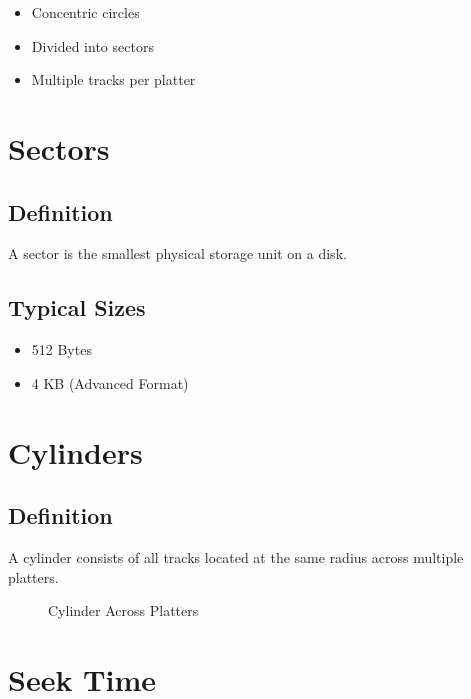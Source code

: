 \begin{itemize}
\item Concentric circles
\item Divided into sectors
\item Multiple tracks per platter
\end{itemize}

\section{Sectors}

\subsection{Definition}

A sector is the smallest physical storage unit on a disk.

\subsection{Typical Sizes}

\begin{itemize}
\item 512 Bytes
\item 4 KB (Advanced Format)
\end{itemize}

\section{Cylinders}

\subsection{Definition}

A cylinder consists of all tracks located at the same radius across multiple platters.

\begin{figure}[h]
\centering
{}
\caption{Cylinder Across Platters}
\end{figure}

\section{Seek Time}

